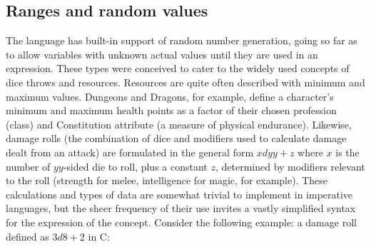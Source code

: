 \subsection{Ranges and random values}
The language has built-in support of random number generation, going so far as to allow variables with unknown actual values until they are used in an expression. These types were conceived to cater to the widely used concepts of dice throws and resources. Resources are quite often described with minimum and maximum values. Dungeons and Dragons, for example, define a character's minimum and maximum health points as a factor of their chosen profession (class) and Constitution attribute (a measure of physical endurance). Likewise, damage rolls (the combination of dice and modifiers used to calculate damage dealt from an attack) are formulated in the general form $xdyy+z$ where $x$ is the number of $yy$-sided die to roll, plus a constant $z$, determined by modifiers relevant to the roll (strength for melee, intelligence for magic, for example). These calculations and types of data are somewhat trivial to implement in imperative languages, but the sheer frequency of their use invites a vastly simplified syntax for the expression of the concept. 	Consider the following example: a damage roll defined as $3d8+2$ in C:
